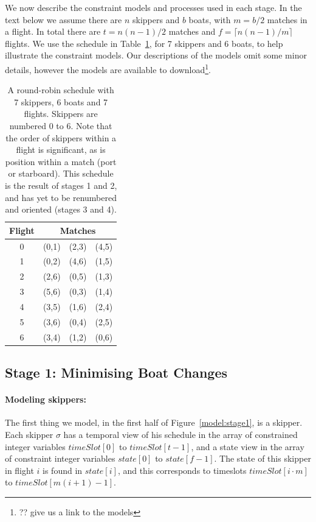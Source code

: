 \documentclass{llncs}
\newcommand{\timeSlot}{\mathit{timeSlot}}
\newcommand{\state}{\mathit{state}}
\begin{document}
We now describe the constraint models and processes used in each stage. In the text below we assume
there are $n$ skippers and $b$ boats, with $m = b/2$ matches in a flight. In total there are $t =
n(n-1)/2$ matches and $f = \lceil n(n-1)/m  \rceil$ flights. We use the schedule in
Table~\ref{tab1}, for 7 skippers and 6 boats, to help illustrate the constraint models. Our
descriptions of the models omit some minor details, however the models are available to
download\footnote{?? give us a link to the models}.

\begin{table}
    \setlength{\tabcolsep}{3pt}
    \begin{tabular}{cccc}
        \toprule
        Flight & \multicolumn{3}{c}{Matches} \\ \midrule
        0 & (0,1) & (2,3) & (4,5) \\
        1 & (0,2) & (4,6) & (1,5) \\
        2 & (2,6) & (0,5) & (1,3) \\
        3 & (5,6) & (0,3) & (1,4) \\
        4 & (3,5) & (1,6) & (2,4) \\
        5 & (3,6) & (0,4) & (2,5) \\
        6 & (3,4) & (1,2) & (0,6) \\ \bottomrule
    \end{tabular}
    \caption{A round-robin schedule with 7 skippers, 6 boats and 7 flights.  Skippers are numbered 0
        to 6. Note that the order of skippers within a flight is significant, as is position within
        a match (port or starboard). This schedule is the result of stages 1 and 2, and has yet to
        be renumbered and oriented (stages 3 and 4).} \label{tab1}
\end{table}

\subsection{Stage 1: Minimising Boat Changes}

\paragraph{Modeling skippers:} The first thing we model, in the first half of
Figure~\ref{model:stage1}, is a skipper. Each skipper $\sigma$ has a temporal view of his schedule
in the array of constrained integer variables $\timeSlot[0]$ to $\timeSlot[{t-1}]$, and a state view
in the array of constraint integer variables $\state[0]$ to $\state[{f-1}]$. The state of this
skipper in flight $i$ is found in $\state[i]$, and this corresponds to timeslots $\timeSlot[{i \cdot
m}]$ to $\timeSlot[{m(i+1)-1}]$.
\end{document}

